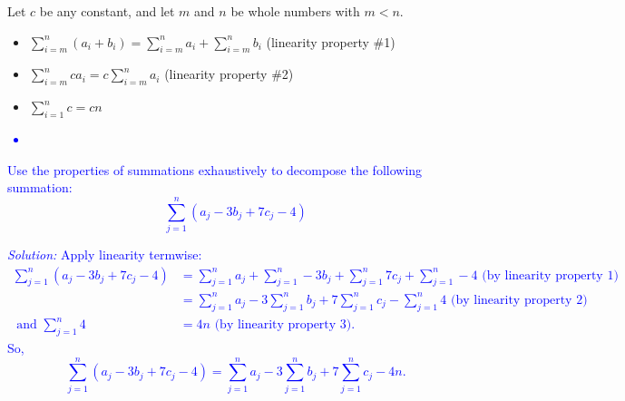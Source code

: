 \documentclass[10pt]{article}
\begin{document}
\newpage

{
Let $c$ be any constant, and let $m$ and $n$ be whole numbers with $m<n$.
\begin{itemize}
\item $\displaystyle\sum_{i=m}^n(a_i+b_i) = \sum_{i=m}^n a_i + \sum_{i=m}^n b_i$ \hfill (linearity property \#1)
\item $\displaystyle\sum_{i=m}^n ca_i = c\sum_{i=m}^n a_i$  \hfill (linearity property \#2)
\item $\displaystyle\sum_{i=1}^n c = cn$
\end{itemize}
}
\par\noindent\textcolor{blue}{
\begin{itemize}
    \item 
\end{itemize}

{\example} Use the properties of summations exhaustively to decompose the following summation: \[\sum_{j=1}^n (a_j-3b_j+7c_j-4)\]

    \par\noindent\textcolor{blue}{\emph{Solution:} Apply linearity termwise:
    \begin{align*}
    \sum_{j=1}^n (a_j-3b_j+7c_j-4) &=\sum_{j=1}^n a_j + \sum_{j=1}^n -3b_j +\sum_{j=1}^n 7c_j + \sum_{j=1}^n - 4 \text{ (by linearity property 1) }\\
    &=\sum_{j=1}^n a_j -3\sum_{j=1}^n b_j +7\sum_{j=1}^n c_j - \sum_{j=1}^n 4 \text{ (by linearity property 2) }\\
    \text{ and } \sum_{j=1}^n 4 &=4n \text{ (by linearity property 3). }
    \end{align*}
    So,
    \[
    \sum_{j=1}^n (a_j-3b_j+7c_j-4) =\sum_{j=1}^n a_j -3\sum_{j=1}^n b_j +7\sum_{j=1}^n c_j -4n.
    \]}
    
    \vfill
    
}
\end{document}

